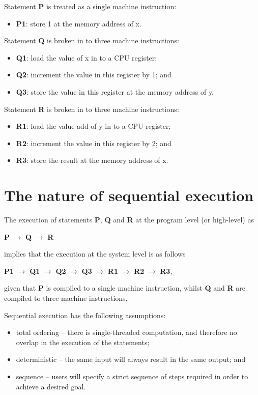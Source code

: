 \documentclass[a4paper]{systems-software}
\begin{document}
Statement \textbf{P} is treated as a single machine instruction:
\begin{itemize}
	\item \textbf{P1}: store 1 at the memory address of x.
\end{itemize}

Statement \textbf{Q} is broken in to three machine instructions:
\begin{itemize}
	\item \textbf{Q1}: load the value of x in to a CPU register;
	\item \textbf{Q2}: increment the value in this register by 1; and
	\item \textbf{Q3}: store the value in this register at the memory address of y.
\end{itemize}

Statement \textbf{R} is broken in to three machine instructions:
\begin{itemize}
	\item \textbf{R1}: load the value add of y in to a CPU register;
	\item \textbf{R2}: increment the value in this register by 2; and
	\item \textbf{R3}: store the result at the memory address of x.
\end{itemize}


\section*{The nature of sequential execution}

The execution of statements \textbf{P}, \textbf{Q} and \textbf{R} at the program level (or high-level) as

	\indent \textbf{P} $\rightarrow$ \textbf{Q} $\rightarrow$ \textbf{R}
	
implies that the execution at the system level is as follows

	\indent \textbf{P1} $\rightarrow$ \textbf{Q1} $\rightarrow$ \textbf{Q2} $\rightarrow$ \textbf{Q3} $\rightarrow$ \textbf{R1} $\rightarrow$ \textbf{R2} $\rightarrow$ \textbf{R3},
	
given that \textbf{P} is compiled to a single machine instruction, whilst \textbf{Q} and \textbf{R} are compiled to three machine instructions.

Sequential execution has the following assumptions:
\begin{itemize}
	\item total ordering -- there is single-threaded computation, and therefore no overlap in the execution of the statements;
	\item deterministic -- the same input will always result in the same output; and
	\item sequence -- users will specify a strict sequence of steps required in order to achieve a desired goal.
\end{itemize}
\end{document}
